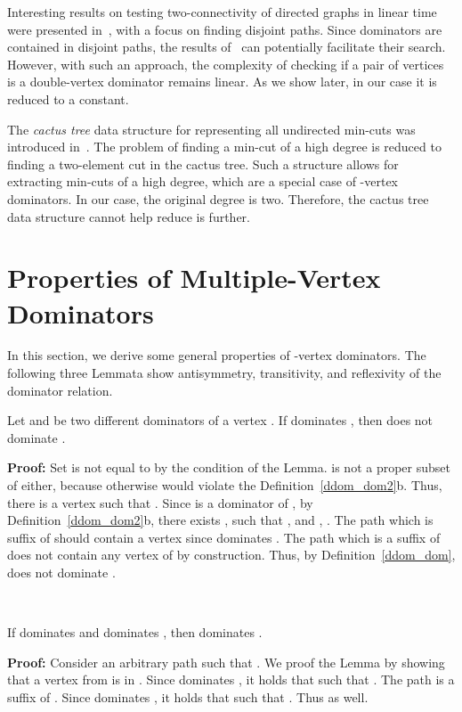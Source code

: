 \documentclass{llncs}
\begin{document}
Interesting results on testing two-connectivity of directed graphs in linear time were presented in~\cite{AbGKM10}, with a focus on finding disjoint paths. Since dominators are contained in disjoint
paths, the results of~\cite{AbGKM10} can potentially facilitate their search. However, with such an approach, the complexity of checking if a pair of vertices is a double-vertex dominator remains
linear. As we show later, in our case it is reduced to a constant.

The {\em cactus tree} data structure for representing all undirected min-cuts was introduced
in~\cite{DiKL76}. The problem of finding a min-cut of a high degree is reduced to finding a two-element
cut in the cactus tree. Such a structure allows for extracting min-cuts of a high degree, which
are a special case of -vertex dominators. In our case, the original degree is two. Therefore,
the cactus tree data structure cannot help reduce is further.

\section{Properties of Multiple-Vertex Dominators} \label{ddom_mdp}

In this section, we derive some general properties of -vertex
dominators. 
The following three Lemmata show antisymmetry, transitivity, and reflexivity
of the dominator relation.

\begin{lemma} \label{ddom_mp01}
Let  and  be two different dominators of a vertex . If 
dominates , then  does not dominate .
\end{lemma}
{\bf Proof:} Set  is not equal to  by the condition of the Lemma. 
is not a proper subset of  either, because otherwise  would
violate the Definition~\ref{ddom_dom2}b. Thus, there is a
vertex  such that .  Since  is a dominator of , by
Definition~\ref{ddom_dom2}b, there exists , such that , and , .  The path  which is suffix of  should contain a vertex  since  dominates . The path  which is
a suffix of  does not contain any vertex of  by
construction. Thus, by Definition~\ref{ddom_dom},  does not dominate
. 
\begin{flushright}
 \\
\end{flushright}

\begin{lemma} \label{ddom_mp02}
If  dominates  and  dominates , then  dominates .
\end{lemma}
{\bf Proof:} Consider an arbitrary path  such that . We proof the Lemma by showing that a vertex from  is in
.  Since  dominates , it holds that  such
that .  The path  is a suffix of .
Since  dominates , it holds that  such that .  Thus  as well. 
\begin{flushright}
 \\
\end{flushright}
\end{document}

